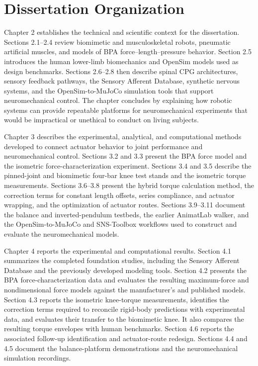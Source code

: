 \section{Dissertation Organization}\label{sec:organization}

Chapter 2 establishes the technical and scientific context for the dissertation. Sections 2.1--2.4 review biomimetic and musculoskeletal robots, pneumatic artificial muscles, and models of BPA force--length--pressure behavior. Section 2.5 introduces the human lower-limb biomechanics and OpenSim models used as design benchmarks. Sections 2.6--2.8 then describe spinal CPG architectures, sensory feedback pathways, the Sensory Afferent Database, synthetic nervous systems, and the OpenSim-to-MuJoCo simulation tools that support neuromechanical control. The chapter concludes by explaining how robotic systems can provide repeatable platforms for neuromechanical experiments that would be impractical or unethical to conduct on living subjects.

Chapter 3 describes the experimental, analytical, and computational methods developed to connect actuator behavior to joint performance and neuromechanical control. Sections 3.2 and 3.3 present the BPA force model and the isometric force-characterization experiment. Sections 3.4 and 3.5 describe the pinned-joint and biomimetic four-bar knee test stands and the isometric torque measurements. Sections 3.6--3.8 present the hybrid torque calculation method, the correction terms for constant length offsets, series compliance, and actuator wrapping, and the optimization of actuator routes. Sections 3.9--3.11 document the balance and inverted-pendulum testbeds, the earlier AnimatLab walker, and the OpenSim-to-MuJoCo and SNS-Toolbox workflows used to construct and evaluate the neuromechanical models.

Chapter 4 reports the experimental and computational results. Section 4.1 summarizes the completed foundation studies, including the Sensory Afferent Database and the previously developed modeling tools. Section 4.2 presents the BPA force-characterization data and evaluates the resulting maximum-force and nondimensional force models against the manufacturer's and published models. Section 4.3 reports the isometric knee-torque measurements, identifies the correction terms required to reconcile rigid-body predictions with experimental data, and evaluates their transfer to the biomimetic knee. It also compares the resulting torque envelopes with human benchmarks. Section 4.6 reports the associated follow-up identification and actuator-route redesign. Sections 4.4 and 4.5 document the balance-platform demonstrations and the neuromechanical simulation recordings.

